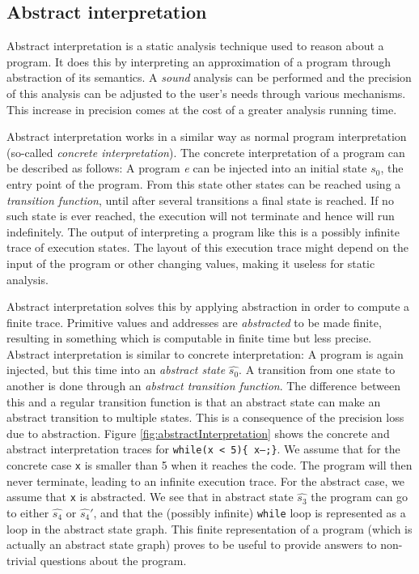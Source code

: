 \subsection{Abstract interpretation}
Abstract interpretation is a static analysis technique used to reason about a program. It does this by interpreting an approximation of a program through abstraction of its semantics. A \textit{sound} analysis can be performed and the precision of this analysis can be adjusted to the user's needs through various mechanisms. This increase in precision comes at the cost of a greater analysis running time. 

Abstract interpretation works in a similar way as normal program interpretation (so-called \textit{concrete interpretation}). The concrete interpretation of a program can be described as follows: A program \textit{e} can be injected into an initial state \textit{$s_0$}, the entry point of the program. From this state other states can be reached using a \textit{transition function}, until after several transitions a final state is reached. If no such state is ever reached, the execution will not terminate and hence will run indefinitely. The output of interpreting a program like this is a possibly infinite trace of execution states. The layout of this execution trace might depend on the input of the program or other changing values, making it useless for static analysis. 

Abstract interpretation solves this by applying abstraction in order to compute a finite trace. Primitive values and addresses are \textit{abstracted} to be made finite, resulting in something which is computable in finite time but less precise. Abstract interpretation is similar to concrete interpretation: A program is again injected, but this time into an \textit{abstract state} $\hat{s_0}$. A transition from one state to another is done through an \textit{abstract transition function}. The difference between this and a regular transition function is that an abstract state can make an abstract transition to multiple states. This is a consequence of the precision loss due to abstraction. Figure \ref{fig:abstractInterpretation} shows the concrete and abstract interpretation traces for \texttt{while(x < 5)\{ x--;\}}. We assume that for the concrete case \texttt{x} is smaller than 5 when it reaches the code. The program will then never terminate, leading to an infinite execution trace. For the abstract case, we assume that \texttt{x} is abstracted. We see that in abstract state $\hat{s_3}$ the program can go to either $\hat{s_4}$ or $\hat{s_4}'$, and that the (possibly infinite) \texttt{while} loop is represented as a loop in the abstract state graph. This finite representation of a program (which is actually an abstract state graph) proves to be useful to provide answers to non-trivial questions about the program.

